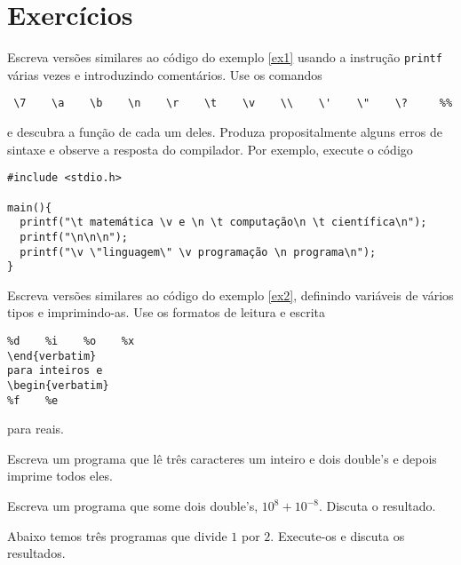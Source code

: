 \section{Exercícios}
\begin{exer} Escreva versões similares ao código do exemplo \ref{ex1} usando a instrução \verb|printf| várias vezes e introduzindo comentários. Use os comandos
\begin{verbatim}
 \7    \a    \b    \n    \r    \t    \v    \\    \'    \"    \?     %%
\end{verbatim}
e descubra a função de cada um deles. Produza propositalmente alguns erros de sintaxe e observe a resposta do compilador. Por exemplo, execute o código
\begin{verbatim}
#include <stdio.h>

main(){
  printf("\t matemática \v e \n \t computação\n \t científica\n");
  printf("\n\n\n");
  printf("\v \"linguagem\" \v programação \n programa\n");
}
\end{verbatim}

\end{exer} 
\begin{exer}
Escreva versões similares ao código do exemplo \ref{ex2}, definindo variáveis de vários tipos e imprimindo-as. Use os formatos de leitura e escrita 
\begin{verbatim}
%d    %i    %o    %x                                                                                                                                                                                                                                                                                     \end{verbatim}
para inteiros e 
\begin{verbatim}
%f    %e 
\end{verbatim}
para reais.
\end{exer}
\begin{exer}
Escreva um programa que lê três caracteres um inteiro e dois double's e depois imprime todos eles. 
\end{exer}

\begin{exer}
 Escreva um programa que some dois double's, $10^{8}+10^{-8}$. Discuta o resultado.
\end{exer}
\begin{exer}Abaixo temos três programas que divide $1$ por $2$. Execute-os e discuta os resultados.
\end{exer}

